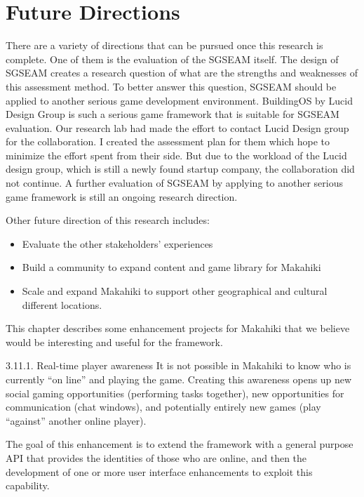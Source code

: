 \section{Future Directions}

There are a variety of directions that can be pursued once this research is complete. One of them is the evaluation of the SGSEAM itself. The design of SGSEAM creates a research question of what are the strengths and weaknesses of this assessment method. 
To better answer this question, SGSEAM should be applied to another serious game development environment. BuildingOS\cite{building-dashboard} by Lucid Design Group is such a serious game framework that is suitable for SGSEAM evaluation. Our research lab had made the effort to contact Lucid Design group for the collaboration. I created the assessment plan for them which hope to minimize the effort spent from their side. But due to the workload of the Lucid design group, which is still a newly found startup company, the collaboration did not continue. A further evaluation of SGSEAM by applying to another serious game framework is still an ongoing research direction.

Other future direction of this research includes:
\begin{itemize}
	\item Evaluate the other stakeholders’ experiences

    \item Build a community to expand content and game library for Makahiki

    \item Scale and expand Makahiki to support other geographical and cultural different locations.

\end{itemize}

This chapter describes some enhancement projects for Makahiki that we believe would be interesting and useful for the framework.

3.11.1. Real-time player awareness
It is not possible in Makahiki to know who is currently “on line” and playing the game. Creating this awareness opens up new social gaming opportunities (performing tasks together), new opportunities for communication (chat windows), and potentially entirely new games (play “against” another online player).

The goal of this enhancement is to extend the framework with a general purpose API that provides the identities of those who are online, and then the development of one or more user interface enhancements to exploit this capability.

